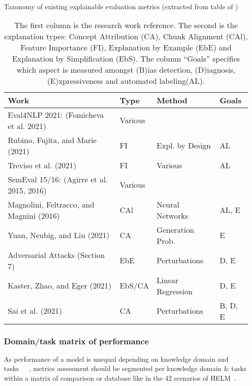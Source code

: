 \documentclass[acmsmall]{acmart}
\begin{document}
\begin{table}[!htp]\centering
\caption{Taxonomy of existing explainable evaluation metrics (extracted from table of \citet{leiterExplainableEvaluationMetrics2022})}\label{Table Explainable Evaluation Metrics}
\begin{tabular}{llll}
\toprule
Work & Type & Method & Goals \\ \midrule
Eval4NLP 2021: (Fomicheva et al. 2021) & Various \\
Rubino, Fujita, and Marie (2021) & FI & Expl. by Design & AL \\
Treviso et al. (2021) & FI & Various & AL \\
SemEval 15/16: (Agirre et al. 2015, 2016) & Various \\
Magnolini, Feltracco, and Magnini (2016) & CAl & Neural Networks & AL, E \\
Yuan, Neubig, and Liu (2021) & CA & Generation Prob. & E \\
Adversarial Attacks (Section 7) & EbE & Perturbations & D, E \\
Kaster, Zhao, and Eger (2021) & EbS/CA & Linear Regression & D, E \\
Sai et al. (2021) & CA & Perturbations & B, D, E \\
\end{tabular}
\caption*{%
The first column is the research work reference. The second is the explanation types: Concept Attribution (CA), Chunk Alignment (CAl), Feature Importance (FI), Explanation by Example (EbE) and Explanation by Simplification (EbS). The column “Goals” specifies which aspect is measured amongst (B)ias detection, (D)iagnosis, (E)xpressiveness and automated labeling(AL).}
\end{table}

\subsubsection{Domain/task matrix of performance}
As performance of a model is unequal depending on knowledge domain and tasks~\citep{bigetal.ImitationGameQuantifying2022}~\citep{bigscienceetal.BLOOM176BParameterOpenAccess2022}~\citep{liangetal.HolisticEvaluationLanguage2022}, metrics assessment should be segmented per knowledge domain \& tasks within a matrix of comparison or database like in the 42 scenarios of HELM~\citep{liangetal.HolisticEvaluationLanguage2022}. 
\end{document}
